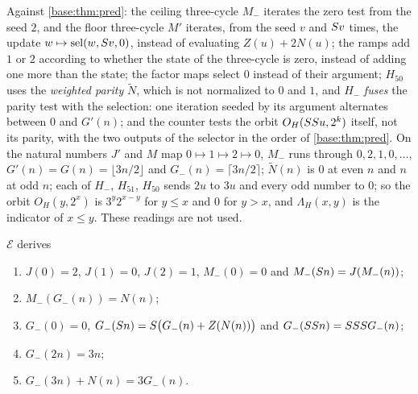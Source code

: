 Against \cref{base:thm:pred}: the ceiling three-cycle $M_-$ iterates the zero
test from the seed $2$, and the floor three-cycle $M'$ iterates, from the
seed $v$ and $S v$ times, the update $w\mapsto\operatorname{sel}(w,S v,0)$, instead of
evaluating $Z(u)+2N(u)$; the ramps add $1$ or $2$ according to whether the
state of the three-cycle is zero, instead of adding one more than the state;
the factor maps select $0$ instead of their argument; $H_{50}$ uses the
\emph{weighted parity} $\tilde N$, which is not normalized to $0$ and $1$,
and $H_-$ \emph{fuses} the parity test with the selection: one iteration
seeded by its argument alternates between $0$ and $G'(n)$; and the counter
tests the orbit $O_H(SS u,2^k)$ itself, not its parity, with the two
outputs of the selector in the order of \cref{base:thm:pred}.  On the
natural numbers $J'$ and $M$ map $0\mapsto 1\mapsto 2\mapsto 0$, $M_-$ runs
through $0,2,1,0,\dots$, $G'(n)=G(n)=\lfloor 3n/2\rfloor$ and
$G_-(n)=\lceil 3n/2\rceil$; $\tilde N(n)$ is $0$ at even $n$ and $n$ at odd
$n$; each of $H_-$, $H_{51}$, $H_{50}$ sends $2u$ to $3u$ and every odd
number to $0$; so the orbit $O_H(y,2^x)$ is $3^y2^{x-y}$ for $y\le x$ and
$0$ for $y>x$, and $\Lambda_H(x,y)$ is the indicator of $x\le y$.  These
readings are not used.

\begin{lemma}
\label{base:lem:ramp57}
$\mathcal E$ derives
\begin{enumerate}[label=\textup{(\roman*)}]
\item $J(0)=2$, $J(1)=0$, $J(2)=1$, $M_-(0)=0$ and $M_-(S n)=J(M_-(n))$;
\item $M_-(G_-(n))=N(n)$;
\item $G_-(0)=0$, $G_-(S n)=S\bigl(G_-(n)+Z(N(n))\bigr)$ and
 $G_-(SS n)=SSS G_-(n)$;
\item $G_-(2n)=3n$;
\item $G_-(3n)+N(n)=3G_-(n)$.
\end{enumerate}
\end{lemma}

